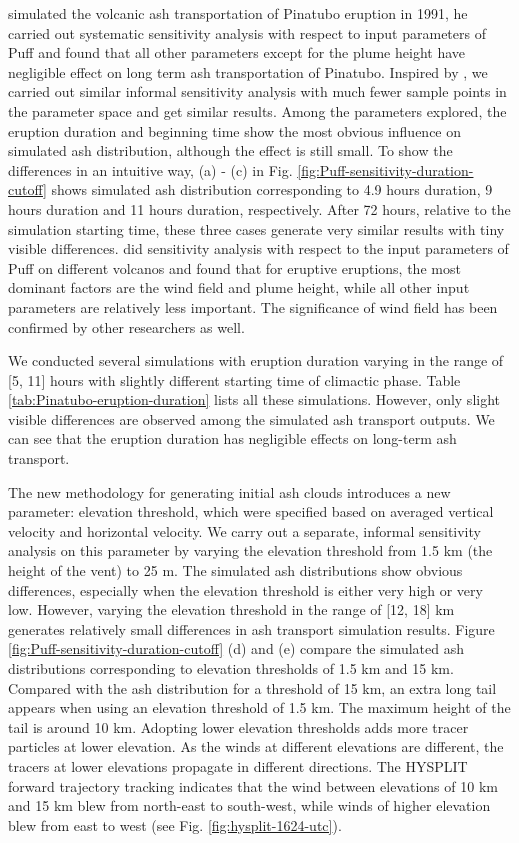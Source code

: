 \documentclass[utf8]{frontiersSCNS} %
\begin{document}
\citet{fero2008simulation} simulated the volcanic ash transportation of Pinatubo eruption in 1991, he carried out systematic sensitivity analysis with respect to input parameters of Puff and found that all other parameters except for the plume height have negligible effect on long term ash transportation of Pinatubo. Inspired by \citet{fero2008simulation}, we carried out similar informal sensitivity analysis with much fewer sample points in the parameter space and get similar results. Among the parameters explored, the eruption duration and beginning time show the most obvious influence on simulated ash distribution, although the effect is still small. To show the differences in an intuitive way, (a) - (c) in Fig. \ref{fig:Puff-sensitivity-duration-cutoff} shows simulated ash distribution corresponding to 4.9 hours duration, 9 hours duration and 11 hours duration, respectively. After 72 hours, relative to the simulation starting time, these three cases generate very similar results with tiny visible differences. \citet{daniele2009applications} did sensitivity analysis with respect to the input parameters of Puff on different volcanos and found that for eruptive eruptions, the most dominant factors are the wind field and plume height, while all other input parameters are relatively less important. The significance of wind field has been confirmed by other researchers \citep[e.g]{stefanescu2014fast} as well.

We conducted several simulations with eruption duration varying in the range of [5, 11] hours with slightly different starting time of climactic phase. Table \ref{tab:Pinatubo-eruption-duration} lists all these simulations. However, only slight visible differences are observed among the simulated ash transport outputs. We can see that the eruption duration has negligible effects on long-term ash transport.

The new methodology for generating initial ash clouds introduces a new parameter: elevation threshold, which were specified based on averaged vertical velocity and horizontal velocity. We carry out a separate, informal sensitivity analysis on this parameter by varying the elevation threshold from 1.5 km (the height of the vent) to 25 m. The simulated ash distributions show obvious differences, especially when the elevation threshold is either very high or very low. However, varying the elevation threshold in the range of [12, 18] km generates relatively small differences in ash transport simulation results.  Figure \ref{fig:Puff-sensitivity-duration-cutoff} (d) and (e) compare the simulated ash distributions corresponding to elevation thresholds of 1.5 km and 15 km. Compared with the ash distribution for a threshold of 15 km, an extra long tail appears when using an elevation threshold of 1.5 km. The maximum height of the tail is around 10 km. Adopting lower elevation thresholds adds more tracer particles at lower elevation. As the winds at different elevations are different, the tracers at lower elevations propagate in different directions. The HYSPLIT forward trajectory tracking indicates that the wind between elevations of 10 km and 15 km blew from north-east to south-west, while winds of higher elevation blew from east to west (see Fig. \ref{fig:hysplit-1624-utc}).
\end{document}
